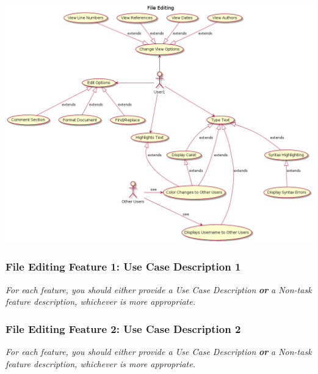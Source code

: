 \documentclass[twoside,letterpaper]{article}
\begin{document}
\includegraphics[width=\textwidth]{images/UseCaseDiagrams/FileEditing}

\newpage

\subsubsection[File Editing Feature 1: Use Case Description 1]{\rmfamily\bfseries\color{black}
	File Editing Feature 1: Use Case Description 1}
\hypertarget{RefHeading22059017292}{}
\bigskip

{\color{black}
	\foreignlanguage{english}{\textit{For each feature, you should either provide a Use Case Description
		}}\foreignlanguage{english}{\textbf{\textit{or}}}\foreignlanguage{english}{\textit{ a Non-task feature description,
		whichever is more appropriate.}}}
\newpage

\subsubsection[File Editing Feature 2: Use Case Description 2]{\rmfamily\bfseries\color{black}
	File Editing Feature 2: Use Case Description 2}
\hypertarget{RefHeading22059017292}{}
\bigskip

{\color{black}
	\foreignlanguage{english}{\textit{For each feature, you should either provide a Use Case Description
		}}\foreignlanguage{english}{\textbf{\textit{or}}}\foreignlanguage{english}{\textit{ a Non-task feature description,
		whichever is more appropriate.}}}
\newpage
\end{document}
